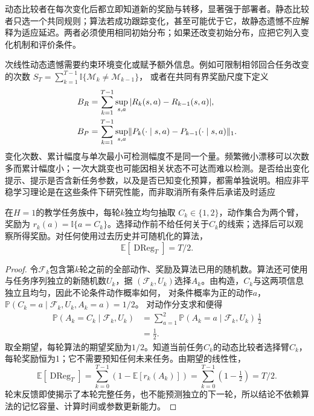 动态比较者在每次变化后都立即知道新的奖励与转移，显著强于部署者。静态比较者只选一个共同规则；算法若成功跟踪变化，甚至可能优于它，故静态遗憾不应解释为适应延迟。两者必须使用相同初始分布；如果还改变初始分布，应把它列入变化机制和评价条件。

次线性动态遗憾需要约束环境变化或赋予额外信息。例如可限制相邻回合任务改变的次数
$S_T=\sum_{k=1}^{T-1}\mathbb I\{\mathcal M_k\ne\mathcal M_{k-1}\}$，
或者在共同有界奖励尺度下定义
\begin{align}
 B_R&=\sum_{k=1}^{T-1}\sup_{s,a}|R_k(s,a)-R_{k-1}(s,a)|,\notag\\
 B_P&=\sum_{k=1}^{T-1}\sup_{s,a}
 \lVert P_k(\cdot\mid s,a)-P_{k-1}(\cdot\mid s,a)\rVert_1.
 \label{eq:rl-transfer-variation}
\end{align}
变化次数、累计幅度与单次最小可检测幅度不是同一个量。频繁微小漂移可以次数多而累计幅度小；一次大跳变也可能因相关状态不可达而难以检测。是否给出变化提示、提示是否含新任务参数，以及是否已知变化预算，都需单独说明。相应非平稳学习理论是在这些条件下研究性能，而非取消所有条件后承诺及时适应

\begin{theorem}[无预告快速变化的两臂下界]
 \label{thm:rl-transfer-linear-regret}
 在$H=1$的教学任务族中，每轮$k$独立均匀抽取
 $C_k\in\{1,2\}$，动作集合为两个臂，奖励为
 $r_k(a)=\mathbb I\{a=C_k\}$。选择动作前不给任何关于$C_k$的线索；选择后可以观察所得奖励。对任何使用过去历史并可随机化的算法，
 \[
 \mathbb E[\operatorname{DReg}_T]=T/2.
 \]
\end{theorem}

\begin{proof}
 令$\mathcal F_k$包含第$k$轮之前的全部动作、奖励及算法已用的随机数。算法还可使用与任务序列独立的新随机数$U_k$，据
 $(\mathcal F_k,U_k)$选择$A_k$。由构造，$C_k$与这两项信息独立且均匀，因此不论条件动作概率如何，
 对条件概率为正的动作$a$，
 $\mathbb P(C_k=a\mid\mathcal F_k,U_k,A_k=a)=1/2$。
 对动作分支求和便得
 \begin{align*}
 \mathbb P(A_k=C_k\mid\mathcal F_k,U_k)
 &=\sum_{a=1}^2
    \mathbb P(A_k=a\mid\mathcal F_k,U_k)\,\tfrac12\\
 &=\tfrac12.
 \end{align*}
 取全期望，每轮算法的期望奖励为$1/2$。知道当前任务$C_k$的动态比较者选择臂$C_k$，每轮奖励恒为1；它不需要预知任何未来任务。由期望的线性性，
 \[
 \mathbb E[\operatorname{DReg}_T]
 =\sum_{k=0}^{T-1}\left(1-\mathbb E[r_k(A_k)]\right)
 =\sum_{k=0}^{T-1}(1-\tfrac12)=T/2.
 \]
 轮末反馈即使揭示了本轮完整任务，也不能预测独立的下一轮，所以结论不依赖算法的记忆容量、计算时间或参数更新能力。
\end{proof}

